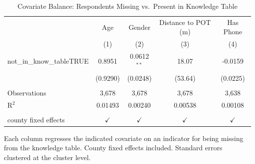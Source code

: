 
\begin{table}[htbp]
   \caption{\label{tab:attrition-balance} Covariate Balance: Respondents Missing vs.\ Present in Knowledge Table}
   \bigskip
   \centering
   \begin{tabular}{lcccc}
      \toprule
                                  & Age           & Gender        & Distance to POT (m) & Has Phone \\   
                                  & (1)           & (2)           & (3)                 & (4)\\  
      \midrule 
      not\_in\_know\_tableTRUE    & 0.8951        & 0.0612$^{**}$ & 18.07               & -0.0159\\   
                                  & (0.9290)      & (0.0248)      & (53.64)             & (0.0225)\\   
       \\
      Observations                & 3,678         & 3,678         & 3,678               & 3,638\\  
      R$^2$                       & 0.01493       & 0.00240       & 0.00538             & 0.00108\\  
       \\
      county fixed effects        & $\checkmark$  & $\checkmark$  & $\checkmark$        & $\checkmark$\\   
      \bottomrule
   \end{tabular}
   
   \par \raggedright 
   Each column regresses the indicated covariate on an indicator for being missing from the knowledge table. County fixed effects included. Standard errors clustered at the cluster level.
\end{table}


